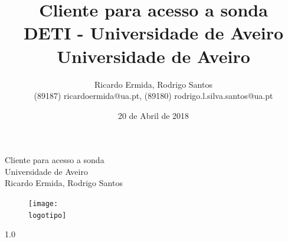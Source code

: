 \documentclass[a4paper]{report}
\begin{document}
%
\def\titulo{Cliente para acesso a sonda}
\def\data{20 de Abril de 2018}
\def\autores{Ricardo Ermida, Rodrigo Santos}
\def\autorescontactos{(89187) ricardoermida@ua.pt, (89180) rodrigo.l.silva.santos@ua.pt}
\def\versao{1.0}
\def\departamento{DETI - Universidade de Aveiro}
\def\empresa{Universidade de Aveiro}
\def\logotipo{ua.pdf}
%
%
\begin{titlepage}

\begin{center}
%
\vspace*{50mm}
%
{\Huge \titulo}\\ 
%
\vspace{10mm}
%
{\Large \empresa}\\
%
\vspace{10mm}
%
{\LARGE \autores}\\ 
%
\vspace{30mm}
%
\begin{figure}[h]
\center
\texttt{[image: \\logotipo]}
\end{figure}
%
\vspace{30mm}
\end{center}
%
\begin{flushright}
\versao
\end{flushright}
\end{titlepage}

\title{%
{\Huge\textbf{\titulo}}\\
{\Large \departamento\\ \empresa}
}
%
\author{%
    \autores \\
    \autorescontactos
}
%
\date{\data}
%
\maketitle

\end{document}
